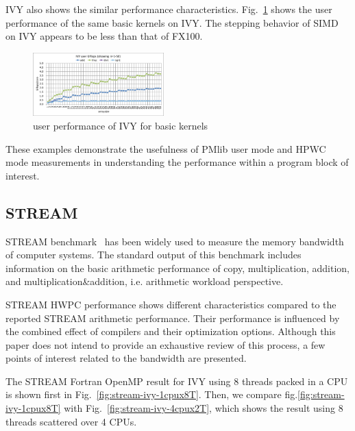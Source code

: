 \documentclass[conference]{IEEEtran}
\begin{document}
IVY also shows the similar performance characteristics.
Fig.~\ref{fig:ivy-gflops-short-R8} shows the user performance
of the same basic kernels on IVY. The stepping behavior of SIMD on IVY
appears to be less than that of FX100.
\begin{figure}[tb]
\centering
\includegraphics[width=0.45\textwidth]{figs/ivy-gflops-short-R8.pdf}
\caption{user performance of IVY for basic kernels}
\label{fig:ivy-gflops-short-R8}
\end{figure}

These examples demonstrate the usefulness of PMlib user mode
and HPWC mode measurements in understanding the performance
within a program block of interest.

%
%
\subsection{STREAM}
\label{subsection:STREAM}
STREAM benchmark~\cite{stream:1995}
has been widely used to measure the memory bandwidth of computer systems.
The standard output of this benchmark includes information on the
basic arithmetic performance of copy, multiplication, addition,
and multiplication\&addition, i.e. arithmetic workload perspective.

STREAM HWPC performance shows different characteristics compared to
the reported STREAM arithmetic performance. Their performance is influenced by
the combined effect of compilers and their optimization options.
Although this paper does not intend to provide an exhaustive review of this process,
a few points of interest related to the bandwidth are presented.

The STREAM Fortran OpenMP result for IVY using 8 threads packed in a CPU
is shown first in Fig.~\ref{fig:stream-ivy-1cpux8T}.
Then, we compare fig.\ref{fig:stream-ivy-1cpux8T}
with
Fig.~\ref{fig:stream-ivy-4cpux2T}, 
which shows the result using 8 threads scattered over 4 CPUs.
\end{document}
